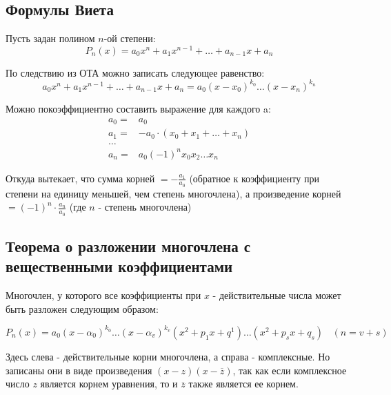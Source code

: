 \documentclass[class=article,a4paper,12pt,crop=false]{standalone}
\begin{document}
\subsection{Формулы Виета}

Пусть задан полином $n$-ой степени:
\begin{equation}
    P_n(x) = a_0x^n + a_1x^{n - 1} + \dots + a_{n - 1}x + a_n
\end{equation}

По следствию из ОТА можно записать следующее равенство:
\begin{equation}
    a_0x^n + a_1x^{n - 1} + \dots + a_{n - 1}x + a_n = a_0(x - x_0)^{k_0}\dots(x - x_n)^{k_n}
\end{equation}

Можно покоэффициентно составить выражение для каждого a:
\begin{equation}
    \begin{aligned}
        a_0 =& a_0 \\
        a_1 =& -a_0 \cdot (x_0 + x_1 + \dots + x_n) \\
        \dots & \\
        a_n =& a_0 (-1)^{n}x_0x_2\dots{x_n}
    \end{aligned}
\end{equation}

Откуда вытекает, что сумма корней $= -\frac{a_1}{a_0}$ (обратное к коэффициенту при степени на единицу
меньшей, чем степень многочлена),
а произведение корней $= (-1)^{n}\cdot\frac{a_n}{a_0}$ (где $n$ - степень многочлена)

\subsection{Теорема о разложении многочлена с вещественными коэффициентами}

Многочлен, у которого все коэффициенты при $x$ - действительные числа может быть
разложен следующим образом:

$P_n(x) = a_0(x - \alpha_0)^{k_0}\dots(x - \alpha_v)^{k_v}(x^2 + p_1x + q^1)\dots(x^2 + p_sx + q_s) \:\:\:\: (n = v + s)$

Здесь слева - действительные корни многочлена, а справа - комплексные. Но записаны они 
в виде произведения $(x - z)(x - \overline{z})$, так как если комплексное
число $z$ является корнем уравнения, то и $\overline{z}$ также является ее корнем.
\end{document}
